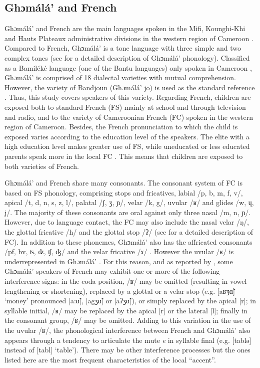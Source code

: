 \documentclass[output=paper,newtxmath,modfonts,nonflat,draftmode]{langsci/langscibook}
\begin{document}
\subsection{Ghɔmálá’ and French} %

Ghɔmálá’ and French are the main languages spoken in the Mifi, Kounghi-Khi and Hauts Plateaux administrative divisions in the western region of Cameroon \citep{Breton1991}. Compared to French, Ghɔmálá’ is a tone language with three simple and two complex tones (see \citet{Nissim1981} for a detailed description of Ghɔmálá’ phonology). Classified as a Bamiléké language (one of the Bantu languages) only spoken in Cameroon \citep{Dieu1983}, Ghɔmálá’ is comprised of 18 dialectal varieties with mutual comprehension. However, the variety of Bandjoun (Ghɔmálá’ jo) is used as the standard reference \citep{Domche1991}. Thus, this study covers speakers of this variety. Regarding French, children are exposed both to standard French (FS) mainly at school and through television and radio, and to the variety of Cameroonian French (FC) spoken in the western region of Cameroon. Besides, the French pronunciation to which the child is exposed varies according to the education level of the speakers. The elite with a high education level makes greater use of FS, while uneducated or less educated parents speak more in the local FC \citep{Biloa2004}. This means that children are exposed to both varieties of French. 

Ghɔmálá’ and French share many consonants. The consonant system of FC is based on FS phonology, comprising stops and fricatives, labial /p, b, m, f, v/, apical /t, d, n, s, z, l/, palatal /ʃ, ʒ, ɲ/, velar /k, g/, uvular /ʁ/ and glides /w, ɥ, j/. The majority of these consonants are oral against only three nasal /m, n, ɲ/. However, due to language contact, the FC may also include the nasal velar /ŋ/, the glottal fricative /h/ and the glottal stop /ʔ/ (see \citet{Biloa2004} for a detailed description of FC). In addition to these phonemes, Ghɔmálá’ also has the affricated consonants /pf, bv, ʦ, ʣ, ʧ, ʤ/ and the velar fricative /ɤ/ \citep{Mba1995}. However the uvular /ʁ/ is underrepresented in Ghɔmálá’ \citep{Mba1995}. For this reason, and as reported by \citet{Biloa2004}, some Ghɔmálá’ speakers of French may exhibit one or more of the following interference signs: in the coda position, /ʁ/ may be omitted (resulting in vowel lengthening or shortening), replaced by a glottal or a velar stop (e.g. [aʁʒɑ̃] `money' pronounced [a:ɑ̃], [agʒɑ̃] or [aʔʒɑ̃]), or simply replaced by the apical [r]; in syllable initial, /ʁ/ may be replaced by the apical [r] or the lateral [l]; finally in the consonant group, /ʁ/ may be omitted. Adding to this variation in the use of the uvular /ʁ/, the phonological interference between French and Ghɔmálá’ also appears through a tendency to articulate the mute \textit{e} in syllable final (e.g. [tablə] instead of [tabl] `table'). There may be other interference processes but the ones listed here are the most frequent characteristics of the local ``accent''. 
\end{document}
